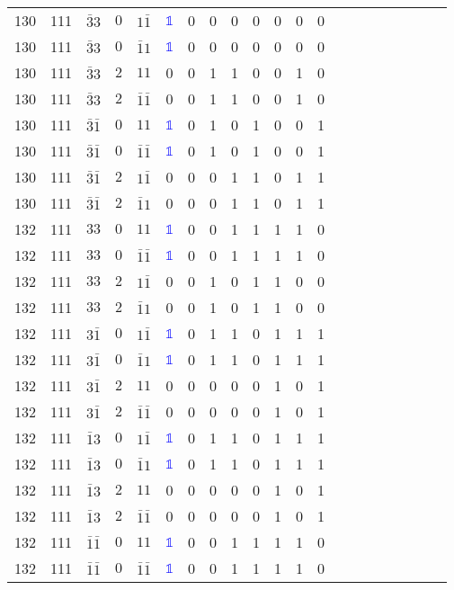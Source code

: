 \begin{longtable*}{c| cccccccccccccccccccc }
130& 111& $\bar{3}3$& $0$& $1\bar{1}$& \textcolor{blue}{$\mathds{1}$}& 0& 0& 0& 0& 0& 0& 0\\
130& 111& $\bar{3}3$& $0$& $\bar{1}1$& \textcolor{blue}{$\mathds{1}$}& 0& 0& 0& 0& 0& 0& 0\\
130& 111& $\bar{3}3$& $2$& $11$& 0& 0& 1& 1& 0& 0& 1& 0\\
130& 111& $\bar{3}3$& $2$& $\bar{1}\bar{1}$& 0& 0& 1& 1& 0& 0& 1& 0\\
130& 111& $\bar{3}\bar{1}$& $0$& $11$& \textcolor{blue}{$\mathds{1}$}& 0& 1& 0& 1& 0& 0& 1\\
130& 111& $\bar{3}\bar{1}$& $0$& $\bar{1}\bar{1}$& \textcolor{blue}{$\mathds{1}$}& 0& 1& 0& 1& 0& 0& 1\\
130& 111& $\bar{3}\bar{1}$& $2$& $1\bar{1}$& 0& 0& 0& 1& 1& 0& 1& 1\\
130& 111& $\bar{3}\bar{1}$& $2$& $\bar{1}1$& 0& 0& 0& 1& 1& 0& 1& 1\\
132& 111& $33$& $0$& $11$& \textcolor{blue}{$\mathds{1}$}& 0& 0& 1& 1& 1& 1& 0\\
132& 111& $33$& $0$& $\bar{1}\bar{1}$& \textcolor{blue}{$\mathds{1}$}& 0& 0& 1& 1& 1& 1& 0\\
132& 111& $33$& $2$& $1\bar{1}$& 0& 0& 1& 0& 1& 1& 0& 0\\
132& 111& $33$& $2$& $\bar{1}1$& 0& 0& 1& 0& 1& 1& 0& 0\\
132& 111& $3\bar{1}$& $0$& $1\bar{1}$& \textcolor{blue}{$\mathds{1}$}& 0& 1& 1& 0& 1& 1& 1\\
132& 111& $3\bar{1}$& $0$& $\bar{1}1$& \textcolor{blue}{$\mathds{1}$}& 0& 1& 1& 0& 1& 1& 1\\
132& 111& $3\bar{1}$& $2$& $11$& 0& 0& 0& 0& 0& 1& 0& 1\\
132& 111& $3\bar{1}$& $2$& $\bar{1}\bar{1}$& 0& 0& 0& 0& 0& 1& 0& 1\\
132& 111& $\bar{1}3$& $0$& $1\bar{1}$& \textcolor{blue}{$\mathds{1}$}& 0& 1& 1& 0& 1& 1& 1\\
132& 111& $\bar{1}3$& $0$& $\bar{1}1$& \textcolor{blue}{$\mathds{1}$}& 0& 1& 1& 0& 1& 1& 1\\
132& 111& $\bar{1}3$& $2$& $11$& 0& 0& 0& 0& 0& 1& 0& 1\\
132& 111& $\bar{1}3$& $2$& $\bar{1}\bar{1}$& 0& 0& 0& 0& 0& 1& 0& 1\\
132& 111& $\bar{1}\bar{1}$& $0$& $11$& \textcolor{blue}{$\mathds{1}$}& 0& 0& 1& 1& 1& 1& 0\\
132& 111& $\bar{1}\bar{1}$& $0$& $\bar{1}\bar{1}$& \textcolor{blue}{$\mathds{1}$}& 0& 0& 1& 1& 1& 1& 0\\

\end{longtable*}

